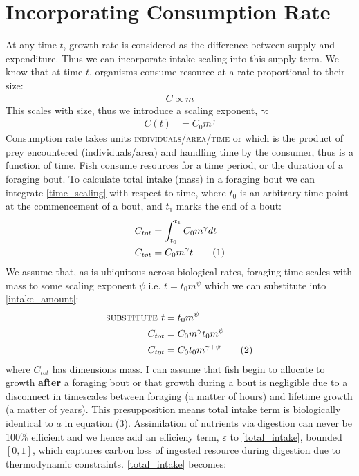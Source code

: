 \documentclass[a4paper]{article} %
\newcommand\numberthis{\addtocounter{equation}{1}\tag{\theequation}}
\begin{document}
\section{Incorporating Consumption Rate}
At any time $t$, growth rate is considered as the difference between supply and expenditure. Thus we can incorporate intake scaling into this supply term.
We know that at time $t$, organisms consume resource at a rate proportional to their size:
\begin{align*}
    C \propto m
\end{align*}
This scales with size, thus we introduce a scaling exponent, $\gamma$:
\begin{align}
    C(t) &= C_{0}m^{\gamma} \label{time_scaling}
\end{align}
Consumption rate takes units \textsc{individuals/area/time} or which is the product of prey encountered (individuals/area) and handling time by the consumer, thus is a function of time. Fish consume resources for a time period, or the duration of a foraging bout. To calculate total intake (mass) in a foraging bout we can integrate \eqref{time_scaling} with respect to time, where $t_0$ is an arbitrary time point at the commencement of a bout, and $t_1$ marks the end of a bout:
\begin{align*}
    C_{tot} &= \int_{t_{0}}^{t_{1}}C_{0}m^{\gamma}dt \\
    C_{tot} &= C_{0}m^{\gamma}t \numberthis \label{intake_amount}
\end{align*}
We assume that, as is ubiquitous across biological rates, foraging time scales with mass to some scaling exponent $\psi$ i.e. $t = t_{0}m^{\psi}$ which we can substitute into \eqref{intake_amount}:
\begin{align*}
    \textsc{substitute } t &= t_{0}m^{\psi} \\
    C_{tot} &= C_{0}m^{\gamma}t_{0}m^{\psi} \\
    C_{tot} &= C_{0}t_{0}m^{\gamma + \psi} \numberthis \label{total_intake}
\end{align*}
where $C_{tot}$ has dimensions mass. I can assume that fish begin to allocate to growth \textbf{after} a foraging bout or that growth during a bout is negligible due to a disconnect in timescales between foraging (a matter of hours) and lifetime growth (a matter of years). This presupposition means total intake term is biologically identical to $a$ in equation (3). Assimilation of nutrients via digestion can never be 100\% efficient and we hence add an efficieny term, $\varepsilon$ to \eqref{total_intake}, bounded $[0,1]$, which captures carbon loss of ingested resource during digestion due to thermodynamic constraints. \eqref{total_intake} becomes:
\end{document}
